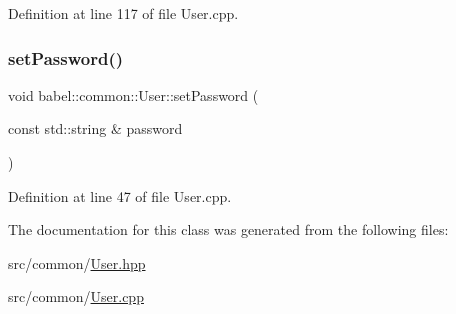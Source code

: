 Definition at line 117 of file User.\+cpp.

\mbox{\label{classbabel_1_1common_1_1_user_a21a022eabf382fc25decbd79001bf206}} 
\subsubsection{\texorpdfstring{set\+Password()}{setPassword()}}
{\footnotesize\ttfamily void babel\+::common\+::\+User\+::set\+Password (\begin{DoxyParamCaption}\item[{const std\+::string \&}]{password }\end{DoxyParamCaption})}



Definition at line 47 of file User.\+cpp.



The documentation for this class was generated from the following files\+:\begin{DoxyCompactItemize}
\item 
src/common/\mbox{\hyperlink{_user_8hpp}{User.\+hpp}}\item 
src/common/\mbox{\hyperlink{_user_8cpp}{User.\+cpp}}\end{DoxyCompactItemize}
